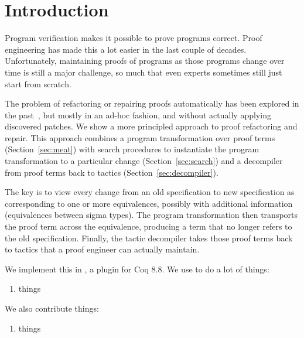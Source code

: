 \section{Introduction}

Program verification makes it possible to prove programs correct.
Proof engineering has made this a lot easier in the last couple of decades.
Unfortunately, maintaining proofs of programs as those programs change over
time is still a major challenge,
so much that even experts sometimes still just start from scratch.

The problem of refactoring or repairing proofs automatically has been explored in the past~\cite{pumpkinpatch},
but mostly in an ad-hoc fashion, and without actually applying discovered patches.
We show a more principled approach to proof refactoring and repair. %
This approach combines a program transformation over proof terms (Section~\ref{sec:meat})
with search procedures to instantiate the program transformation to a particular change (Section~\ref{sec:search})
and a decompiler from proof terms back to tactics (Section~\ref{sec:decompiler}).

The key is to view every change from an old specification to new specification as corresponding to one or more equivalences,
possibly with additional information (equivalences between sigma types).
The program transformation then transports the proof term across the equivalence,
producing a term that no longer refers to the old specification.
Finally, the tactic decompiler takes those proof terms back to tactics that a proof engineer
can actually maintain.

We implement this in \toolname, a plugin for Coq 8.8. We use \toolname to do a lot of things:

\begin{enumerate}
  \item things
\end{enumerate}

We also contribute things:

\begin{enumerate}
\item things
\end{enumerate}
